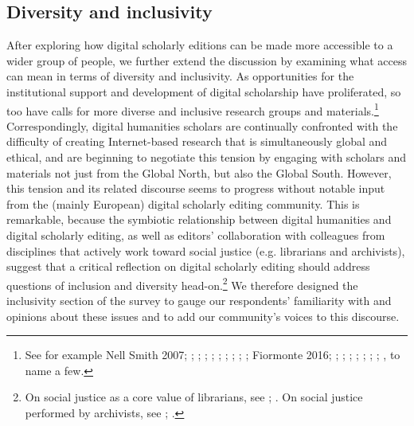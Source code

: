\begin{paper}
\subsection{Diversity and inclusivity}

After exploring how digital scholarly editions can be made more
accessible to a wider group of people, we further extend the discussion
by examining what access can mean in terms of diversity and inclusivity.
As opportunities for the institutional support and development of
digital scholarship have proliferated, so too have calls for more
diverse and inclusive research groups and materials.\footnote{See for
  example Nell Smith 2007; \citealt{earhart_can_2012}; \citealt{fiormonte_towards_2012}; \citealt{liu_where_2012};
  \citealt{mcpherson_why_2012}; \citealt{risam_room_2013}; \citealt{risam_digital_2013}; \citealt{terras_changing_2013};
  \citealt{galina_russell_geographical_2014}; \citealt{bordalejo_diversity_2016}; Fiormonte 2016; \citealt{posner_whats_2016}; \citealt{eadh_diversity_2017}; \citealt{brown_ableism_2018}; \citealt{eichmann-kalwara_representation_2018}; \citealt{liu_digital_2018}; \citealt{losh_bodies_2018};
  \citealt{mahony_cultural_2018}; \citealt{risam_diversity_2018}, to name a few.}
Correspondingly, digital humanities scholars are continually confronted
with the difficulty of creating Internet-based research that is
simultaneously global and ethical, and are beginning to negotiate this
tension by engaging with scholars and materials not just from the Global
North, but also the Global South. However, this tension and its related
discourse seems to progress without notable input from the (mainly
European) digital scholarly editing community. This is remarkable,
because the symbiotic relationship between digital humanities and
digital scholarly editing, as well as editors' collaboration with
colleagues from disciplines that actively work toward social justice
(e.g. librarians and archivists), suggest that a critical reflection on
digital scholarly editing should address questions of inclusion and
diversity head-on.\footnote{On social justice as a core value of
  librarians, see \citealt[533-79]{rubin_foundations_2012}; \citealt{gustina_why_2017}. On
  social justice performed by archivists, see
  \citealt{jimerson_archives_2007}; \citealt{belmonte_archivists_2017}.} We therefore designed the inclusivity section of the
survey to gauge our respondents' familiarity with and opinions about
these issues and to add our community's voices to this discourse.


\end{paper}
